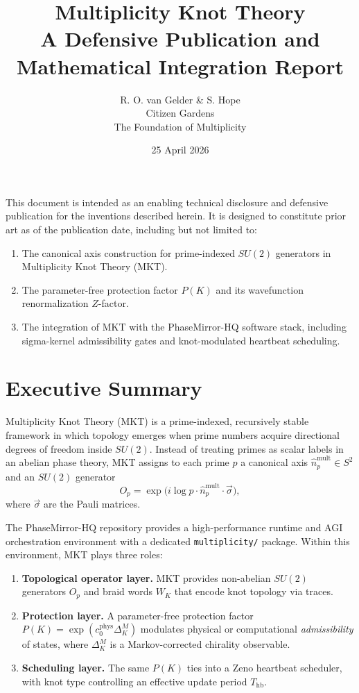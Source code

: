 \documentclass[11pt]{article}
\title{\textbf{Multiplicity Knot Theory}\\[4pt]
A Defensive Publication and Mathematical Integration Report}
\author{R. O. van Gelder \& S. Hope \\ Citizen Gardens \\ The Foundation of Multiplicity}
\date{25 April 2026}
\theoremstyle{remark}
\begin{document}
\maketitle

\begin{tcolorbox}[colback=dkblue!6,colframe=dkblue,title=\textbf{Defensive Publication Notice}]
This document is intended as an enabling technical disclosure and defensive publication
for the inventions described herein. It is designed to constitute prior art as of the
publication date, including but not limited to:
\begin{enumerate}[nosep]
  \item The canonical axis construction for prime-indexed $SU(2)$ generators in
        Multiplicity Knot Theory (MKT).
  \item The parameter-free protection factor $P(K)$ and its wavefunction
        renormalization $Z$-factor.
  \item The integration of MKT with the PhaseMirror-HQ software stack, including
        sigma-kernel admissibility gates and knot-modulated heartbeat scheduling.
\end{enumerate}
\end{tcolorbox}
\newpage
\tableofcontents

\section{Executive Summary}

Multiplicity Knot Theory (MKT) is a prime-indexed, recursively stable framework in
which topology emerges when prime numbers acquire directional degrees of freedom
inside $SU(2)$. Instead of treating primes as scalar labels in an abelian phase
theory, MKT assigns to each prime $p$ a canonical axis
$\hat{n}_p^{\text{mult}} \in S^2$ and an $SU(2)$ generator
\[
  O_p = \exp\!\bigl(i \log p \cdot \hat{n}_p^{\text{mult}} \cdot \vec{\sigma}\bigr),
\]
where $\vec{\sigma}$ are the Pauli matrices.

The PhaseMirror-HQ repository provides a high-performance runtime and AGI
orchestration environment with a dedicated \texttt{multiplicity/} package. Within
this environment, MKT plays three roles:

\begin{enumerate}[label=\textbf{R\arabic*},leftmargin=*]
  \item \textbf{Topological operator layer.} MKT provides non-abelian $SU(2)$
        generators $O_p$ and braid words $W_K$ that encode knot topology via traces.
  \item \textbf{Protection layer.} A parameter-free protection factor
        $P(K) = \exp(c_0^{\text{phys}}\Delta_K^M)$ modulates physical or computational
        \emph{admissibility} of states, where $\Delta_K^M$ is a Markov-corrected
        chirality observable.
  \item \textbf{Scheduling layer.} The same $P(K)$ ties into a Zeno heartbeat
        scheduler, with knot type controlling an effective update period $T_{\text{hb}}$.
\end{enumerate}
\end{document}
